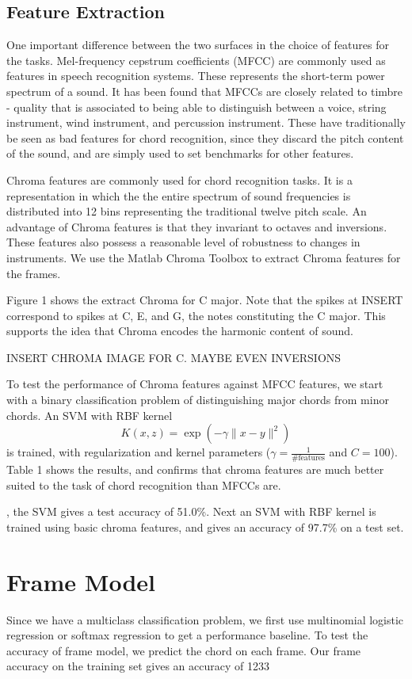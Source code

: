 \documentclass{article}
\begin{document}
\subsection{Feature Extraction}

One important difference between the two surfaces in the choice of features for the tasks. Mel-frequency cepstrum coefficients (MFCC) are commonly used as features in speech recognition systems. These represents the short-term power spectrum of a sound. It has been found that MFCCs are closely related to timbre - quality that is associated to being able to distinguish between a voice, string instrument, wind instrument, and percussion instrument. These have traditionally be seen as bad features for chord recognition, since they discard the pitch content of the sound, and are simply used to set benchmarks for other features.

Chroma features are commonly used for chord recognition tasks. It is a representation in which the the entire spectrum of sound frequencies is distributed into 12 bins representing the traditional twelve pitch scale. An advantage of Chroma features is that they invariant to octaves and inversions. These features also possess a reasonable level of robustness to changes in instruments. We use the Matlab Chroma Toolbox to extract Chroma features for the frames.

Figure 1 shows the extract Chroma for C major. Note that the spikes at INSERT correspond to spikes at C, E, and G, the notes constituting the C major. This supports the idea that Chroma encodes the harmonic content of sound.

INSERT CHROMA IMAGE FOR C. MAYBE EVEN INVERSIONS

To test the performance of Chroma features against MFCC features, we start with a binary classification problem of distinguishing major chords from minor chords. An SVM with RBF kernel $$ K(x, z) = \exp(-\gamma\lVert{x - y}\rVert^2)$$ is trained, with regularization and kernel parameters ($\gamma = \frac{1}{\text{\# features}}$ and $C = 100$). Table 1 shows the results, and confirms that chroma features are much better suited to the task of chord recognition than MFCCs are.

, the SVM gives a test accuracy of 51.0\%. Next an SVM with RBF kernel is trained using basic chroma features, and gives an accuracy of 97.7\% on a test set. 

\section{Frame Model}
Since we have a multiclass classification problem, we first use multinomial logistic regression or softmax regression to get a performance baseline. To test the accuracy of frame model, we predict the chord on each frame. Our frame accuracy on the training set gives an accuracy of 1233%
\end{document}
